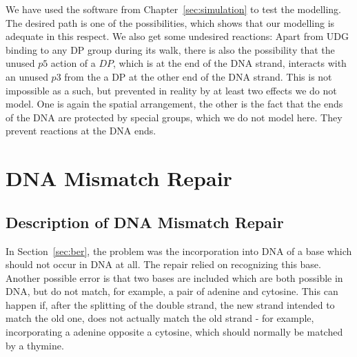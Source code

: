 \documentclass[review]{elsarticle}
\begin{document}
We have used the software from Chapter~\ref{sec:simulation} to test the modelling. The desired path is one of the possibilities, which shows that our modelling is adequate in this respect. We also get some undesired reactions: Apart from UDG binding to any DP group during its walk, there is also the possibility that the unused $p5$ action of a $DP$, which is at the end of the DNA strand, interacts with an unused $p3$ from the a DP at the other end of the DNA strand. This is not impossible as a such, but prevented in reality by at least two effects we do not model. One is again the spatial arrangement, the other is the fact that the ends of the DNA are protected by special groups, which we do not model here. They prevent reactions at the DNA ends.

\section{DNA Mismatch Repair}
\label{sec:dnamimatch}

\subsection{Description of DNA Mismatch Repair}

In Section~\ref{sec:ber}, the problem was the incorporation into DNA of a base which should not occur in DNA at all. The repair relied on recognizing this base. Another possible error is that two bases are included which are both possible in DNA, but do not match, for example, a pair of adenine and cytosine. This can happen if, after the splitting of the double strand, the new strand intended to match the old one, does not actually match the old strand - for example, incorporating a adenine opposite a cytosine, which should normally be matched by a thymine.
\end{document}
